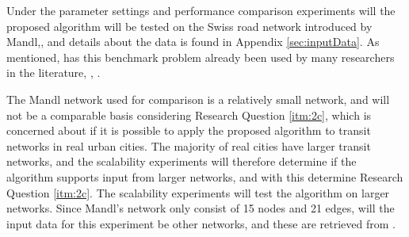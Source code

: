 Under the parameter settings and performance comparison experiments will the proposed algorithm will be tested on the Swiss road network introduced by Mandl,\citep{mandl79}, and details about the data is found in Appendix \vref{sec:inputData}. As mentioned, has this benchmark problem already been used by many researchers in the literature\citep{kechagiopoulos14}, \citep{mandl79}, \citep{fan09}.

The Mandl network used for comparison is a relatively small network, and will not be a comparable basis considering Research Question \vref{itm:2c}, which is concerned about if it is possible to apply the proposed algorithm to transit networks in real urban cities. The majority of real cities have larger transit networks, and the scalability experiments will therefore determine if the algorithm supports input from larger networks, and with this determine Research Question \vref{itm:2c}. The scalability experiments will test the algorithm on larger networks. Since Mandl's network only consist of 15 nodes and 21 edges, will the input data for this experiment be other networks, and these are retrieved from \citet{mumford13}.


